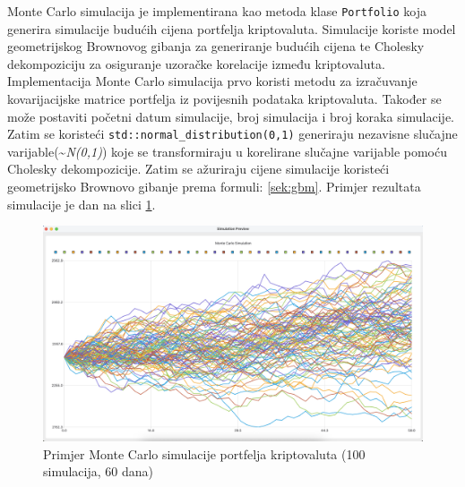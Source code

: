 \documentclass[zavrsnirad, upload]{fer}
\begin{document}
Monte Carlo simulacija je implementirana kao metoda klase
\texttt{Portfolio} koja generira simulacije budućih cijena portfelja
kriptovaluta. Simulacije koriste model geometrijskog Brownovog gibanja
za generiranje budućih cijena te Cholesky dekompoziciju za
osiguranje uzoračke korelacije između kriptovaluta.
Implementacija Monte Carlo simulacija prvo koristi metodu za izračuvanje
kovarijacijske matrice portfelja iz povijesnih podataka kriptovaluta.
Također se može postaviti početni datum simulacije, broj simulacija i
broj koraka simulacije.
Zatim se koristeći \texttt{std::normal\_distribution(0,1)} generiraju
nezavisne slučajne varijable(\textasciitilde \textit{N(0,1)}) koje se
transformiraju u korelirane slučajne varijable pomoću Cholesky dekompozicije.
Zatim se ažuriraju cijene simulacije koristeći geometrijsko Brownovo gibanje
prema formuli:
\ref{sek:gbm}. Primjer rezultata simulacije je dan na slici
\ref{fig:monte_carlo_example}.
\begin{figure}[H]
    \centering
    \includegraphics[width=1.0\textwidth]{Figures/monte_carlo_example.png}
    \caption{Primjer Monte Carlo simulacije portfelja kriptovaluta (100
    simulacija, 60 dana)}
    \label{fig:monte_carlo_example}
\end{figure}
\end{document}
